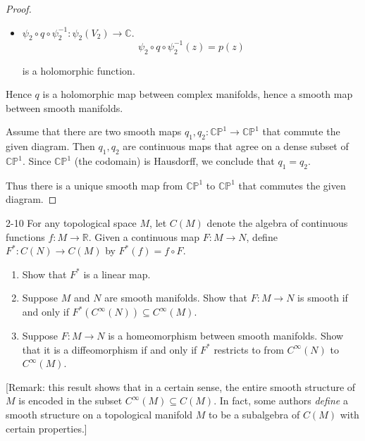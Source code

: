 \begin{proof}
\begin{itemize}[itemsep=0pt]
              is a holomorphic function.
        \item \( \psi_{2} \circ q \circ \psi_{2}^{-1}: \psi_{2}(V_{2}) \to \mathbb{C} \).
              \[
                  \psi_{2} \circ q \circ \psi_{2}^{-1}(z) = p(z)
              \]

              is a holomorphic function.
    \end{itemize}

    Hence \( q \) is a holomorphic map between complex manifolds, hence a smooth map between smooth manifolds.

    Assume that there are two smooth maps \( q_{1}, q_{2}: \mathbb{CP}^{1} \to \mathbb{CP}^{1} \) that commute the given diagram. Then \( q_{1}, q_{2} \) are continuous maps that agree on a dense subset of \( \mathbb{CP}^{1} \). Since \( \mathbb{CP}^{1} \) (the codomain) is Hausdorff, we conclude that \( q_{1} = q_{2} \).

    Thus there is a unique smooth map from \( \mathbb{CP}^{1} \) to \( \mathbb{CP}^{1} \) that commutes the given diagram.
\end{proof}

\begin{problem}{2-10}
    For any topological space \( M \), let \( C(M) \) denote the algebra of continuous functions \( f: M \to \mathbb{R} \). Given a continuous map \( F: M \to N \), define \( F^{\ast}: C(N) \to C(M) \) by \( F^{\ast}(f) = f \circ F \).
    \begin{enumerate}[label={(\alph*)}]
        \item Show that \( F^{\ast} \) is a linear map.
        \item Suppose \( M \) and \( N \) are smooth manifolds. Show that \( F: M \to N \) is smooth if and only if \( F^{\ast}(C^{\infty}(N)) \subseteq C^{\infty}(M) \).
        \item Suppose \( F: M \to N \) is a homeomorphism between smooth manifolds. Show that it is a diffeomorphism if and only if \( F^{\ast} \) restricts to {\color{red}{a bijection}} from \( C^{\infty}(N) \) to \( C^{\infty}(M) \).
    \end{enumerate}
    [Remark: this result shows that in a certain sense, the entire smooth structure of \(M\) is encoded in the subset \( C^{\infty}(M) \subseteq C(M) \). In fact, some authors \emph{define} a smooth structure on a topological manifold \(M\) to be a subalgebra of \(C(M)\) with certain properties.]
\end{problem}

